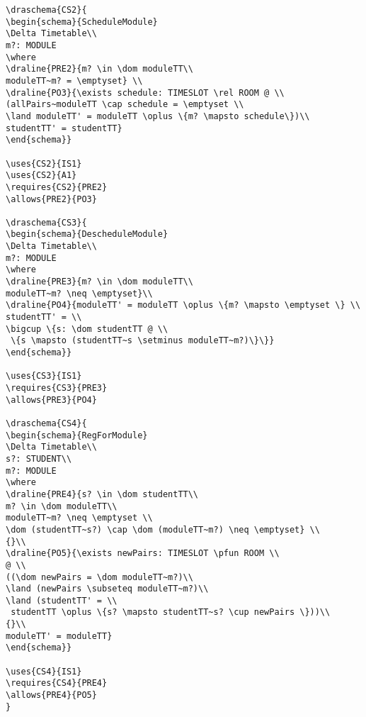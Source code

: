 \begin{verbatim}
\draschema{CS2}{
\begin{schema}{ScheduleModule}
\Delta Timetable\\
m?: MODULE
\where
\draline{PRE2}{m? \in \dom moduleTT\\
moduleTT~m? = \emptyset} \\
\draline{PO3}{\exists schedule: TIMESLOT \rel ROOM @ \\
(allPairs~moduleTT \cap schedule = \emptyset \\
\land moduleTT' = moduleTT \oplus \{m? \mapsto schedule\})\\
studentTT' = studentTT}
\end{schema}}

\uses{CS2}{IS1}
\uses{CS2}{A1}
\requires{CS2}{PRE2}
\allows{PRE2}{PO3}

\draschema{CS3}{
\begin{schema}{DescheduleModule}
\Delta Timetable\\
m?: MODULE
\where
\draline{PRE3}{m? \in \dom moduleTT\\
moduleTT~m? \neq \emptyset}\\
\draline{PO4}{moduleTT' = moduleTT \oplus \{m? \mapsto \emptyset \} \\
studentTT' = \\
\bigcup \{s: \dom studentTT @ \\
 \{s \mapsto (studentTT~s \setminus moduleTT~m?)\}\}}
\end{schema}}

\uses{CS3}{IS1}
\requires{CS3}{PRE3}
\allows{PRE3}{PO4}

\draschema{CS4}{
\begin{schema}{RegForModule}
\Delta Timetable\\
s?: STUDENT\\
m?: MODULE
\where
\draline{PRE4}{s? \in \dom studentTT\\
m? \in \dom moduleTT\\
moduleTT~m? \neq \emptyset \\
\dom (studentTT~s?) \cap \dom (moduleTT~m?) \neq \emptyset} \\
{}\\
\draline{PO5}{\exists newPairs: TIMESLOT \pfun ROOM \\
@ \\
((\dom newPairs = \dom moduleTT~m?)\\
\land (newPairs \subseteq moduleTT~m?)\\
\land (studentTT' = \\
 studentTT \oplus \{s? \mapsto studentTT~s? \cup newPairs \}))\\
{}\\
moduleTT' = moduleTT}
\end{schema}}

\uses{CS4}{IS1}
\requires{CS4}{PRE4}
\allows{PRE4}{PO5}
}

\end{verbatim}